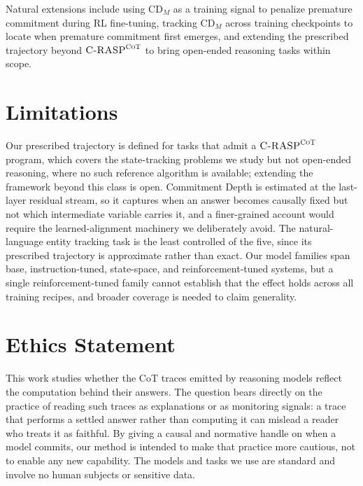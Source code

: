 \documentclass[11pt]{article}
\newcommand{\CDM}{\mathrm{CD}_{M}}
\newcommand{\CRASPCoT}{\textsc{C-RASP}^{\textsc{CoT}}}
\begin{document}
Natural extensions include using $\CDM$ as a training signal to penalize
premature commitment during RL fine-tuning, tracking $\CDM$ across training
checkpoints to locate when premature commitment first emerges, and extending the
prescribed trajectory beyond $\CRASPCoT$ to bring open-ended reasoning tasks
within scope.

\section*{Limitations}

Our prescribed trajectory is defined for tasks that admit a $\CRASPCoT$ program,
which covers the state-tracking problems we study but not open-ended reasoning,
where no such reference algorithm is available; extending the framework beyond
this class is open. Commitment Depth is estimated at the last-layer residual
stream, so it captures when an answer becomes causally fixed but not which
intermediate variable carries it, and a finer-grained account would require the
learned-alignment machinery we deliberately avoid. The natural-language entity
tracking task is the least controlled of the five, since its prescribed
trajectory is approximate rather than exact. Our model families span base,
instruction-tuned, state-space, and reinforcement-tuned systems, but a single
reinforcement-tuned family cannot establish that the effect holds across all
training recipes, and broader coverage is needed to claim generality.

\section*{Ethics Statement}

This work studies whether the CoT traces emitted by reasoning models
reflect the computation behind their answers. The question bears directly on the
practice of reading such traces as explanations or as monitoring signals: a
trace that performs a settled answer rather than computing it can mislead a
reader who treats it as faithful. By giving a causal and normative handle on
when a model commits, our method is intended to make that practice more
cautious, not to enable any new capability. The models and tasks we use are
standard and involve no human subjects or sensitive data.


\end{document}
